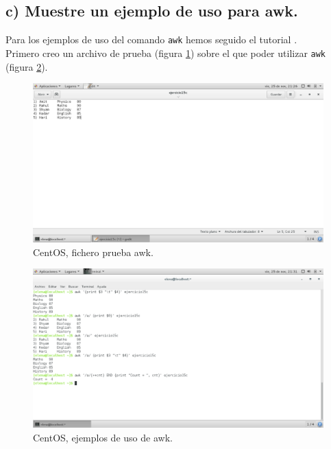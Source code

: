 \subsection{c) Muestre un ejemplo de uso para awk.}
Para los ejemplos de uso del comando \texttt{awk} hemos seguido el tutorial \cite{awk}.\\

Primero creo un archivo de prueba (figura \ref{fig:ejercicio15c_1}) sobre el que poder utilizar \texttt{awk} (figura \ref{fig:ejercicio15c_2}).

\begin{figure}[H] 
	\centering
	\includegraphics[width=15cm]{./img/ejercicio15c_1.png} 	
	\caption{CentOS, fichero prueba awk.} \label{fig:ejercicio15c_1}
\end{figure}

\begin{figure}[H] 
	\centering
	\includegraphics[width=15cm]{./img/ejercicio15c_2.png} 	
	\caption{CentOS, ejemplos de uso de awk.} \label{fig:ejercicio15c_2}
\end{figure}




